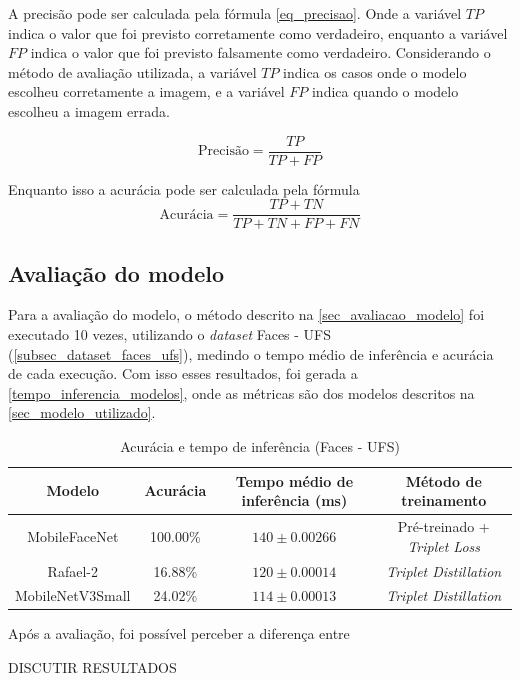 \label{sect_restultados_metricas_precisao}
A precisão pode ser calculada pela fórmula \ref{eq_precisao}. Onde a variável $TP$ indica o valor que foi previsto corretamente como verdadeiro,
enquanto a variável $FP$ indica o valor que foi previsto falsamente como verdadeiro.
Considerando o método de avaliação utilizada, a variável $TP$ indica os casos onde o modelo escolheu corretamente a
imagem, e a variável $FP$  indica quando o modelo escolheu a imagem errada.

\begin{equation}\label{eq_precisao}
	\text{Precisão} = \frac {TP} {TP + FP}
\end{equation}

\label{sect_restultados_metricas_acuracia}
Enquanto isso a acurácia pode ser calculada pela fórmula \
\begin{equation}\label{eq_acuracia}
	\text{Acurácia} = \frac {TP + TN} {TP + TN + FP + FN}
\end{equation}

\subsection{Avaliação do modelo}
Para a avaliação do modelo, o método descrito na \autoref{sec_avaliacao_modelo} foi executado 10 vezes,
utilizando o \textit{dataset} Faces - UFS (\ref{subsec_dataset_faces_ufs}), medindo o tempo médio de inferência
e acurácia de cada execução. Com isso esses resultados, foi gerada a \autoref{tempo_inferencia_modelos}, onde as
métricas são dos modelos descritos na \autoref{sec_modelo_utilizado}.


\begin{center}
\begin{table}[htb]
\centering
\ABNTEXfontereduzida
\caption[Acurácia e tempo de inferência (Faces - UFS)]{Acurácia e tempo de inferência (Faces - UFS)}
\label{tempo_inferencia_modelos}
\begin{tabular}{ |c|c|c|c| }
	\hline
	\textbf{Modelo} & \textbf{Acurácia} & \textbf{Tempo médio de inferência (ms)} & \textbf{Método de treinamento} \\
	\hline
	MobileFaceNet 		& 	100.00\% 	& $140 \pm 0.00266$ & Pré-treinado + \textit{Triplet Loss} \\
	Rafael-2	 	& 	 16.88\% 	& $120 \pm 0.00014$ & \textit{Triplet Distillation} \\
	MobileNetV3Small 	& 	 24.02\% 	& $114 \pm 0.00013$ & \textit{Triplet Distillation} \\
	\hline
\end{tabular}
\end{table}
\end{center}

Após a avaliação, foi possível perceber a diferença entre

DISCUTIR RESULTADOS
